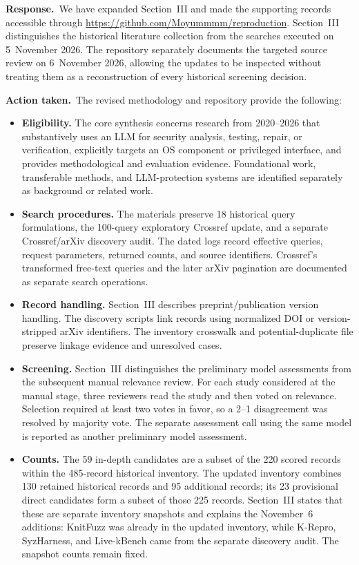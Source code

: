 \documentclass[11pt,a4paper]{article}
\newcommand{\response}{\par\textbf{Response.}\ }
\newcommand{\action}{\par\textbf{Action taken.}\ }
\newcommand{\repo}{\url{https://github.com/Moyummmm/reproduction}}
\begin{document}
\response We have expanded Section~III and made the supporting records accessible through \repo. Section~III distinguishes the historical literature collection from the searches executed on 5~November 2026. The repository separately documents the targeted source review on 6~November 2026, allowing the updates to be inspected without treating them as a reconstruction of every historical screening decision.

\action The revised methodology and repository provide the following:
\begin{itemize}
\item \textbf{Eligibility.} The core synthesis concerns research from 2020--2026 that substantively uses an LLM for security analysis, testing, repair, or verification, explicitly targets an OS component or privileged interface, and provides methodological and evaluation evidence. Foundational work, transferable methods, and LLM-protection systems are identified separately as background or related work.
\item \textbf{Search procedures.} The materials preserve 18 historical query formulations, the 100-query exploratory Crossref update, and a separate Crossref/arXiv discovery audit. The dated logs record effective queries, request parameters, returned counts, and source identifiers. Crossref's transformed free-text queries and the later arXiv pagination are documented as separate search operations.
\item \textbf{Record handling.} Section~III describes preprint/publication version handling. The discovery scripts link records using normalized DOI or version-stripped arXiv identifiers. The inventory crosswalk and potential-duplicate file preserve linkage evidence and unresolved cases.
\item \textbf{Screening.} Section~III distinguishes the preliminary model assessments from the subsequent manual relevance review. For each study considered at the manual stage, three reviewers read the study and then voted on relevance. Selection required at least two votes in favor, so a 2--1 disagreement was resolved by majority vote. The separate assessment call using the same model is reported as another preliminary model assessment.
\item \textbf{Counts.} The 59 in-depth candidates are a subset of the 220 scored records within the 485-record historical inventory. The updated inventory combines 130 retained historical records and 95 additional records; its 23 provisional direct candidates form a subset of those 225 records. Section~III states that these are separate inventory snapshots and explains the November~6 additions: KnitFuzz was already in the updated inventory, while K-Repro, SyzHarness, and Live-kBench came from the separate discovery audit. The snapshot counts remain fixed.
\end{itemize}
\end{document}
